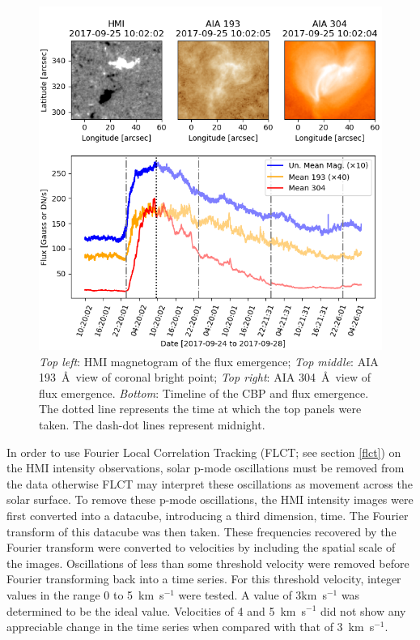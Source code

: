 \begin{figure}
    \centering
    \includegraphics[width=\linewidth]{./04CBPs/figs/1896.png}
    \caption[Timeline of Flux Emergence]{\textit{Top left}: HMI magnetogram of the flux emergence; \textit{Top middle}: AIA 193~\AA\ view of coronal bright point; \textit{Top right}: AIA 304~\AA\ view of flux emergence. \textit{Bottom}: Timeline of the CBP and flux emergence. The dotted line represents the time at which the top panels were taken. The dash-dot lines represent midnight.}
    \label{fig:cbptl}
\end{figure}

In order to use Fourier Local Correlation Tracking (FLCT; see section \ref{flct}) on the HMI intensity observations, solar p-mode oscillations \citep{deubner_observations_1975} must be removed from the data otherwise FLCT may interpret these oscillations as movement across the solar surface. To remove these p-mode oscillations, the HMI intensity images were first converted into a datacube, introducing a third dimension, time. The Fourier transform of this datacube was then taken. These frequencies recovered by the Fourier transform were converted to velocities by including the spatial scale of the images. Oscillations of less than some threshold velocity were removed before Fourier transforming back into a time series. For this threshold velocity, integer values in the range 0 to 5~km~s$^{-1}$ were tested. A value of 3km~s$^{-1}$ was determined to be the ideal value. Velocities of 4 and 5~km~s$^{-1}$ did not show any appreciable change in the time series when compared with that of 3~km~s$^{-1}$. 

